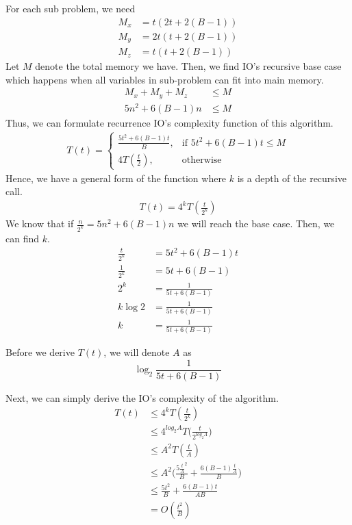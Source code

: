 For each sub problem, we need
\begin{align*}
	M_x &= t(2t + 2(B-1)) \\
	M_y &= 2t(t+2(B-1))\\
	M_z &= t(t+2(B-1))
\end{align*}
Let $M$ denote the total memory we have. Then, we find IO's recursive base case which happens when all variables in sub-problem can fit into main memory.
\begin{align*}
M_x + M_y + M_z &\leq M \\
5n^2 + 6(B-1)n &\leq M
\end{align*}
Thus, we can formulate recurrence IO's complexity function of this algorithm.
\begin{align*}
	T(t) = \begin{cases}
	    \frac{5t^2 + 6(B-1)t}{B},& \text{if } 5t^2 + 6(B-1)t \leq M\\
	    4T(\frac{t}{2}),              & \text{otherwise}
	\end{cases}
\end{align*}
Hence, we have a general form of the function where $k$ is a depth of the recursive call.
\begin{align*}
	T(t) = 4^{k}T(\frac{t}{2^{k}})
\end{align*}
We know that if $\frac{n}{2^{k}} = 5n^2 + 6(B-1)n$ we will reach the base case. Then, we can find $k$.
\begin{align*}
	\frac{t}{2^k} &= 5t^2 + 6(B-1)t \\
	\frac{1}{2^k	} &= 5t + 6(B-1) \\
	2^k &= \frac{1}{5t + 6(B-1)} \\
	k\log2 &= \frac{1}{5t + 6(B-1)} \\
	k &= \frac{1}{5t + 6(B-1)}
\end{align*}

Before we derive $T(t)$, we will denote $A$ as
$$\log_2 \frac{1}{5t + 6(B-1)}$$

Next, we can simply derive the IO's complexity of the algorithm.
\begin{align*}
	T(t) &\leq 4^{k}T(\frac{t}{2^{k}}) \\
	&\leq 4^{log_2 A}T\Big(\frac{t}{2^{log_2 A}}\Big) \\
	&\leq A^2T(\frac{t}{A}) \\
	&\leq A^2\Big( \frac{5\frac{t}{A}^2}{B} + \frac{6(B-1)\frac{t}{A}}{B} \Big) \\
	&\leq \frac{5t^2}{B} + \frac{6(B-1)t}{AB} \\
	&= O(\frac{t^2}{B})
\end{align*}

